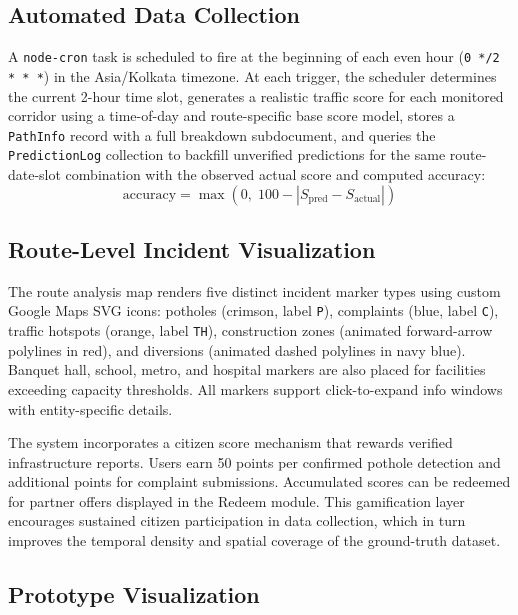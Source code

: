 \documentclass[conference]{IEEEtran}
\begin{document}
\subsection{Automated Data Collection}

A \texttt{node-cron} task is scheduled to fire at the beginning of each even hour (\texttt{0 */2 * * *}) in the Asia/Kolkata timezone. At each trigger, the scheduler determines the current 2-hour time slot, generates a realistic traffic score for each monitored corridor using a time-of-day and route-specific base score model, stores a \texttt{PathInfo} record with a full breakdown subdocument, and queries the \texttt{PredictionLog} collection to backfill unverified predictions for the same route-date-slot combination with the observed actual score and computed accuracy:
\begin{equation}
\text{accuracy} = \max(0,\; 100 - |S_{\text{pred}} - S_{\text{actual}}|)
\label{eq:accuracy}
\end{equation}

\subsection{Route-Level Incident Visualization}

The route analysis map renders five distinct incident marker types using custom Google Maps SVG icons: potholes (crimson, label \texttt{P}), complaints (blue, label \texttt{C}), traffic hotspots (orange, label \texttt{TH}), construction zones (animated forward-arrow polylines in red), and diversions (animated dashed polylines in navy blue). Banquet hall, school, metro, and hospital markers are also placed for facilities exceeding capacity thresholds. All markers support click-to-expand info windows with entity-specific details.

The system incorporates a citizen score mechanism that rewards verified infrastructure reports. Users earn 50 points per confirmed pothole detection and additional points for complaint submissions. Accumulated scores can be redeemed for partner offers displayed in the Redeem module. This gamification layer encourages sustained citizen participation in data collection, which in turn improves the temporal density and spatial coverage of the ground-truth dataset.

\subsection{Prototype Visualization}
\end{document}
